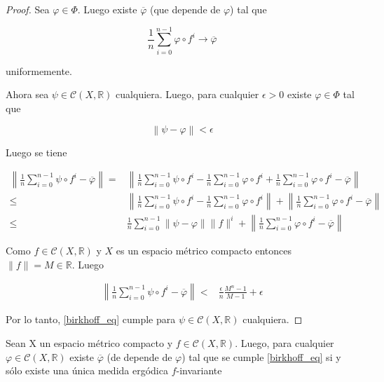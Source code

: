 \begin{proof}
	Sea $\varphi \in \Phi$. Luego existe $\overline{\varphi}$ (que depende de $\varphi$) tal que
	
	\begin{equation}
		\frac{1}{n} \sum_{i=0}^{n-1} \varphi \circ f^i \rightarrow \overline{\varphi}
	\end{equation}
	
	uniformemente.
	
	Ahora sea $\psi \in \mathcal{C}(X,\mathbb{R})$ cualquiera. Luego, para cualquier $\epsilon>0$ existe $\varphi \in \Phi$ tal que
	
	\begin{equation}
		\left\| \psi - \varphi \right\| < \epsilon
	\end{equation}
	
	Luego se tiene
	
	\begin{align}
		\left\| \frac{1}{n} \sum_{i=0}^{n-1} \psi \circ f^i - \overline{\varphi} \right\| =& \left\| \frac{1}{n} \sum_{i=0}^{n-1} \psi \circ f^i - \frac{1}{n} \sum_{i=0}^{n-1} \varphi \circ f^i + \frac{1}{n} \sum_{i=0}^{n-1} \varphi \circ f^i - \overline{\varphi} \right\|\\		
		\leq & \left\| \frac{1}{n} \sum_{i=0}^{n-1} \psi \circ f^i - \frac{1}{n} \sum_{i=0}^{n-1} \varphi \circ f^i \right\| + \left\| \frac{1}{n} \sum_{i=0}^{n-1} \varphi \circ f^i - \overline{\varphi} \right\|\\
		\leq & \frac{1}{n} \sum_{i=0}^{n-1} \| \psi - \varphi \| \| f \|^i + \left\| \frac{1}{n} \sum_{i=0}^{n-1} \varphi \circ f^i - \overline{\varphi} \right\|
	\end{align}
	
	Como $f \in \mathcal{C}(X,\mathbb{R})$ y $X$ es un espacio métrico compacto entonces $\|f\|=M \in \mathbb{R}$. Luego
	
	\begin{align}
		\left\| \frac{1}{n} \sum_{i=0}^{n-1} \psi \circ f^i - \overline{\varphi} \right\| < & \frac{\epsilon}{n} \frac{M^n-1}{M-1} + \epsilon
	\end{align}
	
	Por lo tanto, \eqref{birkhoff_eq} cumple para $\psi \in \mathcal{C}(X,\mathbb{R})$ cualquiera.
\end{proof}

\begin{lema}\label{lema_varphi_continua}
	Sean X un espacio métrico compacto y $f \in \mathcal{C}(X,\mathbb{R})$. Luego, para cualquier $\varphi \in \mathcal{C}(X,\mathbb{R})$ existe $\overline{\varphi}$ (de depende de $\varphi$) tal que se cumple \eqref{birkhoff_eq} si y sólo existe una única medida ergódica $f$-invariante
\end{lema}

